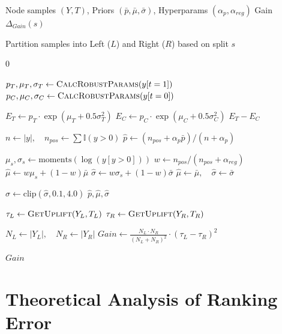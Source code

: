 \documentclass[runningheads]{llncs}
\begin{document}
\begin{algorithm}[h]
\caption{Implementation of ZILN-Euclidean Splitting Criterion}
\label{alg:robust_ziln_split}
\begin{algorithmic}[1]
\Require Node samples $(Y, T)$, Priors $(\bar{p}, \bar{\mu}, \bar{\sigma})$, Hyperparams $(\alpha_p, \alpha_{reg})$
\Ensure Gain $\Delta_{Gain}(s)$

\State Partition samples into Left ($L$) and Right ($R$) based on split $s$

    \Return $0$ 
\EndIf

    \State $p_T, \mu_T, \sigma_T \gets \Call{CalcRobustParams}{y[t=1]}$
    \State $p_C, \mu_C, \sigma_C \gets \Call{CalcRobustParams}{y[t=0]}$
    
    \State $E_T \gets p_T \cdot \exp(\mu_T + 0.5 \sigma_T^2)$
    \State $E_C \gets p_C \cdot \exp(\mu_C + 0.5 \sigma_C^2)$
    \Return $E_T - E_C$
\EndFunction

    \State $n \gets |y|, \quad n_{pos} \gets \sum \mathbb{I}(y>0)$
    \State $\hat{p} \gets (n_{pos} + \alpha_p \bar{p}) / (n + \alpha_p)$
    
        \State $\mu_s, \sigma_s \gets \text{moments}(\log(y[y>0]))$
        \State $w \gets n_{pos} / (n_{pos} + \alpha_{reg})$
        \State $\hat{\mu} \gets w \mu_s + (1-w) \bar{\mu}$
        \State $\hat{\sigma} \gets w \sigma_s + (1-w) \bar{\sigma}$
    \Else
        \State $\hat{\mu} \gets \bar{\mu}, \quad \hat{\sigma} \gets \bar{\sigma}$
    \EndIf
    
    \State $\hat{\sigma} \gets \text{clip}(\hat{\sigma}, 0.1, 4.0)$
    \Return $\hat{p}, \hat{\mu}, \hat{\sigma}$
\EndFunction

\State $\tau_L \gets \Call{GetUplift}{Y_L, T_L}$
\State $\tau_R \gets \Call{GetUplift}{Y_R, T_R}$

\State $N_L \gets |Y_L|, \quad N_R \gets |Y_R|$
\State $Gain \gets \frac{N_L \cdot N_R}{(N_L + N_R)^2} \cdot (\tau_L - \tau_R)^2$

\Return $Gain$
\end{algorithmic}
\end{algorithm}

\section{Theoretical Analysis of Ranking Error}
\label{appendix:theoretical_analysis}
\end{document}
